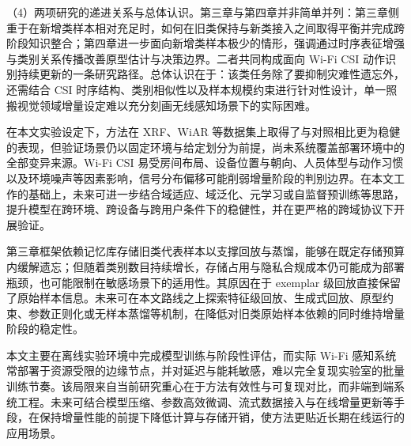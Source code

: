 （4）两项研究的递进关系与总体认识。第三章与第四章并非简单并列：第三章侧重于在新增类样本相对充足时，如何在旧类保持与新类接入之间取得平衡并完成跨阶段知识整合；第四章进一步面向新增类样本极少的情形，强调通过时序表征增强与类别关系传播改善原型估计与决策边界。二者共同构成面向 Wi-Fi CSI 动作识别持续更新的一条研究路径。总体认识在于：该类任务除了要抑制灾难性遗忘外，还需结合 CSI 时序结构、类别相似性以及样本规模约束进行针对性设计，单一照搬视觉领域增量设定难以充分刻画无线感知场景下的实际困难。


在本文实验设定下，方法在 XRF、WiAR 等数据集上取得了与对照相比更为稳健的表现，但验证场景仍以固定环境与给定划分为前提，尚未系统覆盖部署环境中的全部变异来源。Wi-Fi CSI 易受房间布局、设备位置与朝向、人员体型与动作习惯以及环境噪声等因素影响，信号分布偏移可能削弱增量阶段的判别边界。在本文工作的基础上，未来可进一步结合域适应、域泛化、元学习或自监督预训练等思路，提升模型在跨环境、跨设备与跨用户条件下的稳健性，并在更严格的跨域协议下开展验证。

第三章框架依赖记忆库存储旧类代表样本以支撑回放与蒸馏，能够在既定存储预算内缓解遗忘；但随着类别数目持续增长，存储占用与隐私合规成本仍可能成为部署瓶颈，也可能限制在敏感场景下的适用性。其原因在于 exemplar 级回放直接保留了原始样本信息。未来可在本文路线之上探索特征级回放、生成式回放、原型约束、参数正则化或无样本蒸馏等机制，在降低对旧类原始样本依赖的同时维持增量阶段的稳定性。

本文主要在离线实验环境中完成模型训练与阶段性评估，而实际 Wi-Fi 感知系统常部署于资源受限的边缘节点，并对延迟与能耗敏感，难以完全复现实验室的批量训练节奏。该局限来自当前研究重心在于方法有效性与可复现对比，而非端到端系统工程。未来可结合模型压缩、参数高效微调、流式数据接入与在线增量更新等手段，在保持增量性能的前提下降低计算与存储开销，使方法更贴近长期在线运行的应用场景。
